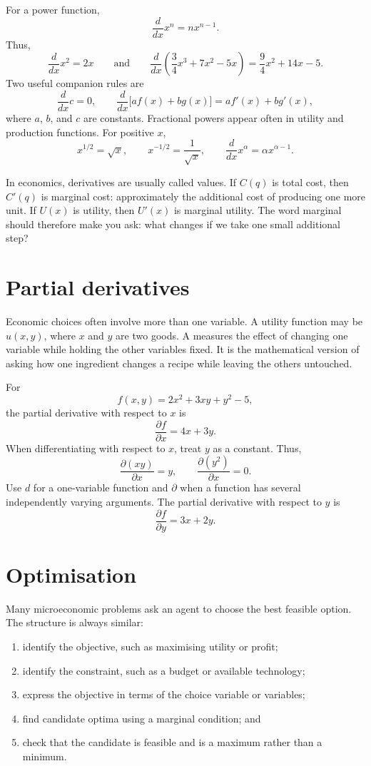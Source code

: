 For a power function,
\[
\frac{d}{dx}x^n=nx^{n-1}.
\]
Thus,
\[
\frac{d}{dx}x^2=2x
\qquad\text{and}\qquad
\frac{d}{dx}\left(\frac{3}{4}x^3+7x^2-5x\right)=\frac{9}{4}x^2+14x-5.
\]
Two useful companion rules are
\[
\frac{d}{dx}c=0,
\qquad
\frac{d}{dx}\bigl[af(x)+bg(x)\bigr]=af'(x)+bg'(x),
\]
where $a$, $b$, and $c$ are constants. Fractional powers appear often in
utility and production functions. For positive $x$,
\[
x^{1/2}=\sqrt{x},
\qquad
x^{-1/2}=\frac{1}{\sqrt{x}},
\qquad
\frac{d}{dx}x^\alpha=\alpha x^{\alpha-1}.
\]

In economics, derivatives are usually called  values. If
$C(q)$ is total cost, then $C'(q)$ is marginal cost: approximately the
additional cost of producing one more unit. If $U(x)$ is utility, then
$U'(x)$ is marginal utility. The word marginal should therefore make you ask:
what changes if we take one small additional step?

\section{Partial derivatives}

Economic choices often involve more than one variable. A utility function may
be $u(x,y)$, where $x$ and $y$ are two goods. A 
measures the effect of changing one variable while holding the other variables
fixed. It is the mathematical version of asking how one ingredient changes a
recipe while leaving the others untouched.

For
\[
f(x,y)=2x^2+3xy+y^2-5,
\]
the partial derivative with respect to $x$ is
\[
\frac{\partial f}{\partial x}=4x+3y.
\]
When differentiating with respect to $x$, treat $y$ as a constant. Thus,
\[
\frac{\partial(xy)}{\partial x}=y,
\qquad
\frac{\partial(y^2)}{\partial x}=0.
\]
Use $d$ for a one-variable function and $\partial$ when a function has
several independently varying arguments. The partial derivative with respect
to $y$ is
\[
\frac{\partial f}{\partial y}=3x+2y.
\]

\section{Optimisation}

Many microeconomic problems ask an agent to choose the best feasible option.
The structure is always similar:
\begin{enumerate}
  \item identify the objective, such as maximising utility or profit;
  \item identify the constraint, such as a budget or available technology;
  \item express the objective in terms of the choice variable or variables;
  \item find candidate optima using a marginal condition; and
  \item check that the candidate is feasible and is a maximum rather than a minimum.
\end{enumerate}

